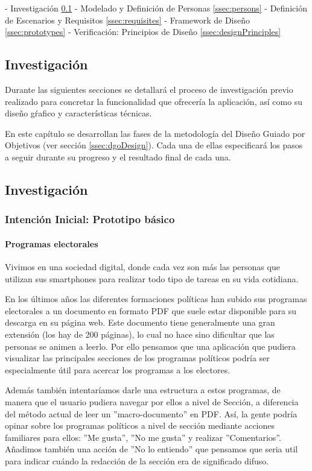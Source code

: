 - Investigación \ref{ssec:investigation}
- Modelado y Definición de Personas \ref{ssec:persons}
- Definición de Escenarios y Requisitos \ref{ssec:requisites}
- Framework de Diseño \ref{ssec:prototypes}
- Verificación: Principios de Diseño \ref{ssec:designPrinciples}

\subsection{Investigación} \label{ssec:investigation}

Durante las siguientes secciones se detallará el proceso de investigación previo realizado para concretar la funcionalidad que ofrecería la aplicación, así como su diseño gŕafico y características técnicas.

En este capítulo se desarrollan las fases de la metodología del Diseño Guiado por Objetivos (ver sección \ref{ssec:dgoDesign}). Cada una de ellas especificará los pasos a seguir durante su progreso y el resultado final de cada una.

\subsection{Investigación}

\subsubsection{Intención Inicial: Prototipo básico}  

\paragraph{Programas electorales}

Vivimos en una sociedad digital, donde cada vez son más las personas que utilizan sus smartphones para realizar todo tipo de tareas en su vida cotidiana.

En los últimos años las diferentes formaciones políticas han subido sus programas electorales a un documento en formato PDF que suele estar disponible para su descarga en su página web. Este documento tiene generalmente una gran extensión (los hay de 200 páginas), lo cual no hace sino dificultar que las personas se animen a leerlo. Por ello pensamos que una aplicación que pudiera visualizar las principales secciones de los programas políticos podría ser especialmente útil para acercar los programas a los electores.

Además también intentaríamos darle una estructura a estos programas, de manera que el usuario pudiera navegar por ellos a nivel de Sección, a diferencia del método actual de leer un ''macro-documento'' en PDF. Así, la gente podría opinar sobre los programas políticos a nivel de sección mediante acciones familiares para ellos: ''Me gusta'', ''No me gusta'' y realizar ''Comentarios''. Añadimos también una acción de ''No lo entiendo'' que pensamos que seria util para indicar cuándo la redacción de la sección era de significado difuso.

